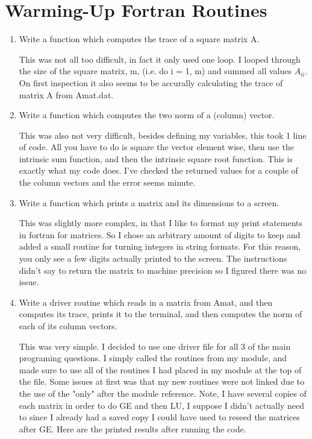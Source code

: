 \documentclass{article}
\begin{document}
\section{Warming-Up Fortran Routines}
\begin{enumerate}
\item Write a function which computes the trace of a square matrix A. 

This was not all too difficult, in fact it only used one loop. I looped through the size of the square matrix, m, (i.e. do i = 1, m) and summed all values $A_{ii}$. On first inspection it also seems to be accurally calculating the trace of matrix A from Amat.dat. 

\item Write a function which computes the two norm of a (column) vector.

This was also not very difficult, besides defining my variables, this took 1 line of code. All you have to do is square the vector element wise, then use the intrinsic sum function, and then the intrinsic square root function. This is exactly what my code does. I've checked the returned values for a couple of the column vectors and the error seems minute. 

\item Write a function which prints a matrix and its dimensions to a screen.

This was slightly more complex, in that I like to format my print statements in fortran for matrices. So I chose an arbitrary amount of digits to keep and added a small routine for turning integers in string formats. For this reason, you only see a few digits actually printed to the screen. The instructions didn't say to return the matrix to machine precision so I figured there was no issue. 

\item Write a driver routine which reads in a matrix from Amat, and then computes its trace, prints it to the terminal, and then computes the norm of each of its column vectors. 

This was very simple. I decided to use one driver file for all 3 of the main programing questions. I simply called the routines from my module, and made sure to use all of the routines I had placed in my module at the top of the file. Some issues at first was that my new routines were not linked due to the use of the "only" after the module reference. Note, I have several copies of each matrix in order to do GE and then LU, I suppose I didn't actually need to since I already had a saved copy I could have used to reseed the matrices after GE. Here are the printed results after running the code. 


\end{enumerate}
\end{document}

